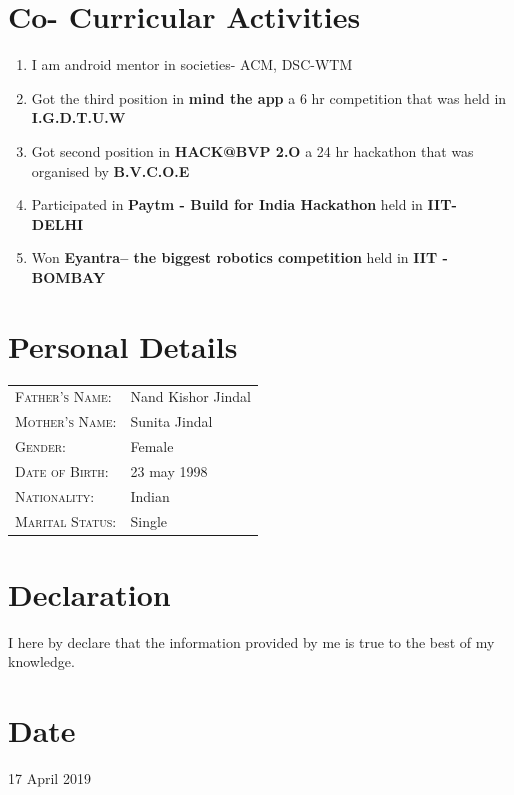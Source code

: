 \documentclass{article}
\begin{document}
	\section{Co- Curricular Activities}
		\begin{enumerate}
			\item {I am android mentor in societies- ACM, DSC-WTM}
			\item{ Got the third position in \textbf{mind the app} a 6 hr competition that was held in \textbf{I.G.D.T.U.W }}
			\item {Got second position in \textbf{HACK@BVP 2.O} a 24 hr hackathon that was organised by \textbf{B.V.C.O.E}}
			\item { Participated in \textbf{Paytm - Build for India Hackathon} held in \textbf{IIT- DELHI}}
			\item { Won \textbf{Eyantra-- the biggest robotics competition} held in \textbf{IIT - BOMBAY}}
		\end{enumerate}
	\section{Personal Details}
		\begin{tabular}{ll}\\
			\textsc{Father's Name: }& Nand Kishor Jindal\\
			\textsc{Mother's Name: }&Sunita Jindal\\
			\textsc{Gender: }&Female\\
			\textsc{Date of Birth: }&23 may 1998\\
			\textsc{Nationality: }&Indian\\
			\textsc{Marital Status: }& Single\\
		\end{tabular}
	\section{Declaration}
		I here by declare that the information provided by me is true to the best of my knowledge.
	\section{Date}
		17 April 2019
\end{document}
